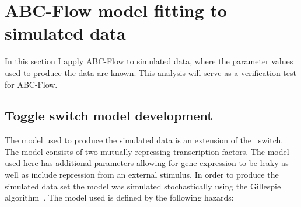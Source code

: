 %
%
\clearpage
\section{ABC-Flow model fitting to simulated data }



In this section I apply ABC-Flow to simulated data, where the parameter values used to produce the data are known. This analysis will serve as a verification test for ABC-Flow. 

\subsection{Toggle switch model development}
The model used to produce the simulated data is an extension of the~\textcite{Gardner:2000vha} switch. The model consists of two mutually repressing transcription factors. The model used here has additional parameters allowing for gene expression to be leaky as well as include repression from an external stimulus. In order to produce the simulated data set the model was simulated stochastically using the Gillespie algorithm~\autocite{Gillespie:1977ww}. The model used is defined by the following hazards:

